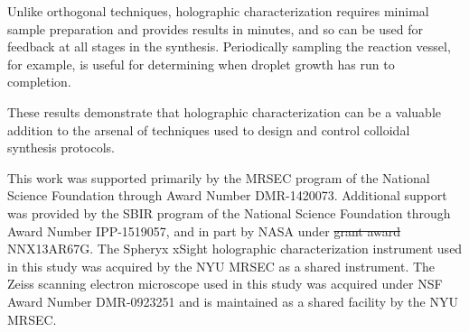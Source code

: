 \documentclass[journal=langd5,manuscript=article]{achemso}
\providecommand{\DIFadd}[1]{{\protect\color{blue}\uwave{#1}}} %
\providecommand{\DIFdel}[1]{{\protect\color{red}\sout{#1}}}                      %
\providecommand{\DIFaddbegin}{} %
\providecommand{\DIFaddend}{} %
\providecommand{\DIFdelbegin}{} %
\providecommand{\DIFdelend}{} %
\begin{document}
Unlike orthogonal techniques, holographic characterization requires minimal
sample preparation and provides results in minutes,
and so can be used for feedback at all stages in
the synthesis.
Periodically sampling the reaction vessel, for example, 
is useful for determining when droplet growth has
run to completion.

These results demonstrate that holographic characterization can be a valuable
addition to the arsenal of techniques used to design and control colloidal
synthesis protocols.

\begin{acknowledgement}
\DIFdelbegin %

\DIFdelend This work was supported primarily by the MRSEC program of
the National Science Foundation through Award Number DMR-1420073.
Additional support was provided by the SBIR program of the
National Science Foundation through Award Number IPP-1519057, and in part by
NASA under \DIFdelbegin \DIFdel{grant award }\DIFdelend \DIFaddbegin \DIFadd{Award Number }\DIFaddend NNX13AR67G.
The Spheryx xSight holographic characterization instrument
used in this study was acquired by the NYU MRSEC as a shared
instrument.
The Zeiss scanning electron microscope used in this study
was acquired under
NSF Award Number DMR-0923251 and is maintained as a shared
facility by the NYU MRSEC.

\end{acknowledgement}

%
%
\end{document}
